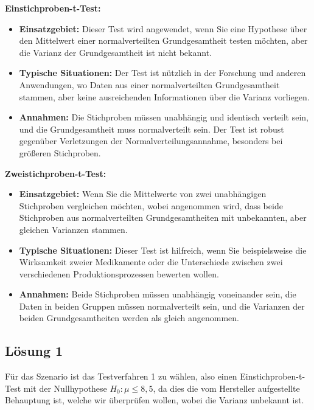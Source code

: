 \documentclass[main.tex]{subfiles}
\begin{document}
\textbf{Einstichproben-t-Test:}
\begin{itemize}
\item \textbf{Einsatzgebiet:} Dieser Test wird angewendet, wenn Sie eine Hypothese über den Mittelwert einer normalverteilten Grundgesamtheit testen möchten, aber die Varianz der Grundgesamtheit ist nicht bekannt.
\item \textbf{Typische Situationen:} Der Test ist nützlich in der Forschung und anderen Anwendungen, wo Daten aus einer normalverteilten Grundgesamtheit stammen, aber keine ausreichenden Informationen über die Varianz vorliegen.
\item \textbf{Annahmen:} Die Stichproben müssen unabhängig und identisch verteilt sein, und die Grundgesamtheit muss normalverteilt sein. Der Test ist robust gegenüber Verletzungen der Normalverteilungsannahme, besonders bei größeren Stichproben.
\end{itemize}
\vspace{1cm}
\textbf{Zweistichproben-t-Test:}
\begin{itemize}
\item \textbf{Einsatzgebiet:} Wenn Sie die Mittelwerte von zwei unabhängigen Stichproben vergleichen möchten, wobei angenommen wird, dass beide Stichproben aus normalverteilten Grundgesamtheiten mit unbekannten, aber gleichen Varianzen stammen.
\item \textbf{Typische Situationen:} Dieser Test ist hilfreich, wenn Sie beispielsweise die Wirksamkeit zweier Medikamente oder die Unterschiede zwischen zwei verschiedenen Produktionsprozessen bewerten wollen.
\item \textbf{Annahmen:} Beide Stichproben müssen unabhängig voneinander sein, die Daten in beiden Gruppen müssen normalverteilt sein, und die Varianzen der beiden Grundgesamtheiten werden als gleich angenommen.
\end{itemize}

\subsection{Lösung 1}

Für das Szenario ist das Testverfahren 1 zu wählen, also einen Einstichproben-t-Test mit der Nullhypothese $H_0: \mu \leq 8,5$, da dies die vom Hersteller aufgestellte Behauptung ist, welche wir überprüfen wollen, wobei die Varianz unbekannt ist. 
\end{document}
